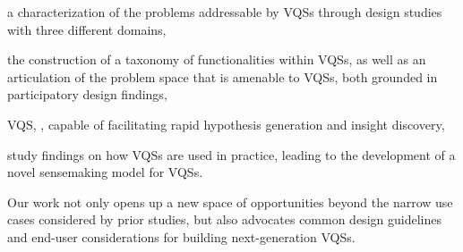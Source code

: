 \begin{denselist}
\item a characterization of the problems addressable by VQSs through design studies with three different domains,
\item the construction of a taxonomy of functionalities within VQSs, as well as an articulation of the problem space that is amenable to VQSs, both grounded in participatory design findings,
\item {} VQS, \zvpp,  capable of facilitating rapid hypothesis generation and insight discovery,
\item study findings on how VQSs are used in practice, leading to the development of a novel sensemaking model for VQSs. %
\end{denselist}
Our work not only opens up a new space of opportunities beyond the narrow use cases considered by prior studies, but also advocates common design guidelines and end-user considerations for building next-generation VQSs.
